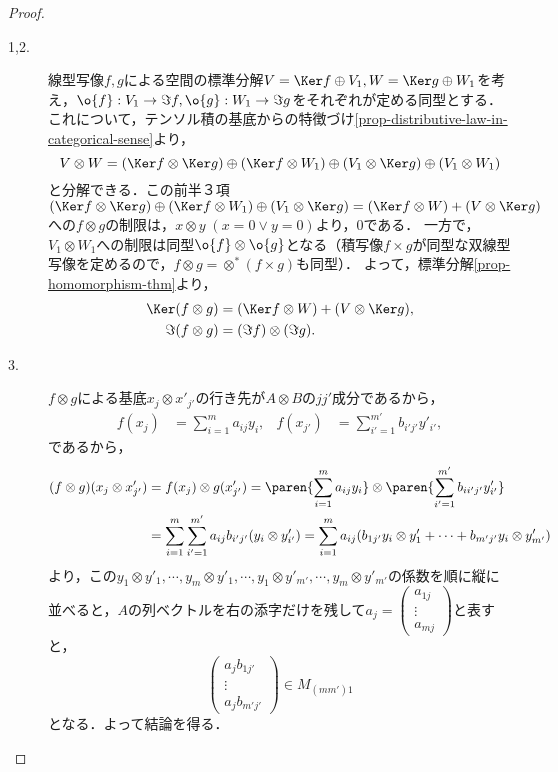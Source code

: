 \documentclass[uplatex, dvipdfmx]{jsreport}
\begin{document}
\begin{proof}\mbox{}
    \begin{description}
        \item[1,2.] 
        線型写像$f,g$による空間の標準分解$V=\Ker f\oplus V_1,W=\Ker g\oplus W_1$を考え，$\o{f}:V_1\to\Im f,\o{g}:W_1\to\Im g$をそれぞれが定める同型とする．
        これについて，テンソル積の基底からの特徴づけ\ref{prop-distributive-law-in-categorical-sense}より，
        \[V\otimes W=(\Ker f\otimes\Ker g)\oplus(\Ker f\otimes W_1)\oplus(V_1\otimes\Ker g)\oplus(V_1\otimes W_1)\]
        と分解できる．この前半３項$(\Ker f\otimes\Ker g)\oplus(\Ker f\otimes W_1)\oplus(V_1\otimes\Ker g)=(\Ker f\otimes W)+(V\otimes\Ker g)$への$f\otimes g$の制限は，$x\otimes y\;(x=0\lor y=0)$より，$0$である．
        一方で，$V_1\otimes W_1$への制限は同型$\o{f}\otimes\o{g}$となる（積写像$f\times g$が同型な双線型写像を定めるので，$f\otimes g=\otimes^*(f\times g)$も同型）．
        よって，標準分解\ref{prop-homomorphism-thm}より，
        \begin{align*}
            \Ker(f\otimes g)&=(\Ker f\otimes W)+(V\otimes\Ker g),\\
            \Im (f\otimes g)&=(\Im f)\otimes(\Im g).
        \end{align*}
        \item[3.]
        $f\otimes g$による基底$x_j\otimes x'_{j'}$の行き先が$A\otimes B$の$jj'$成分であるから，
        \begin{align*}
            f(x_j)&=\sum^m_{i=1}a_{ij}y_i,&f(x_{j'})&=\sum^{m'}_{i'=1}b_{i'j'}y'_{i'},
        \end{align*}
        であるから，
        \begin{align*}
            (f\otimes g)(x_j\otimes x'_{j'})&=f(x_j)\otimes g(x'_{j'})=\paren{\sum^m_{i=1}a_{ij}y_i}\otimes\paren{\sum^{m'}_{i'=1}b_{ii'j'}y'_{i'}}\\
            &=\sum^m_{i=1}\sum^{m'}_{i'=1}a_{ij}b_{i'j'}(y_i\otimes y'_{i'})=\sum^{m}_{i=1}a_{ij}(b_{1j'}y_i\otimes y'_1+\cdots+b_{m'j'}y_i\otimes y'_{m'})
        \end{align*}
        より，この$y_1\otimes y'_1,\cdots,y_m\otimes y'_1,\cdots,y_1\otimes y'_{m'},\cdots,y_m\otimes y'_{m'}$の係数を順に縦に並べると，$A$の列ベクトルを右の添字だけを残して$a_j=\begin{pmatrix}a_{1j}\\\vdots\\a_{mj}\end{pmatrix}$と表すと，
        \[\begin{pmatrix}a_jb_{1j'}\\\vdots\\a_jb_{m'j'}\end{pmatrix}\in M_{(mm')1}\]
        となる．よって結論を得る．
    \end{description}
\end{proof}
\end{document}
